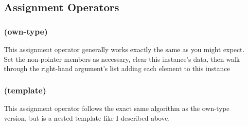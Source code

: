 \subsection{Assignment Operators}

\subsubsection{ (own-type)}
\indent This assignment operator generally works exactly the same as you might
expect. Set the non-pointer members as necessary, clear this instance's
data, then walk through the right-hand argument's list adding each
element to this instance

\subsubsection{ (template)}
\indent This assignment operator follows the exact same algorithm as the own-type
version, but is a nested template like I described above.
